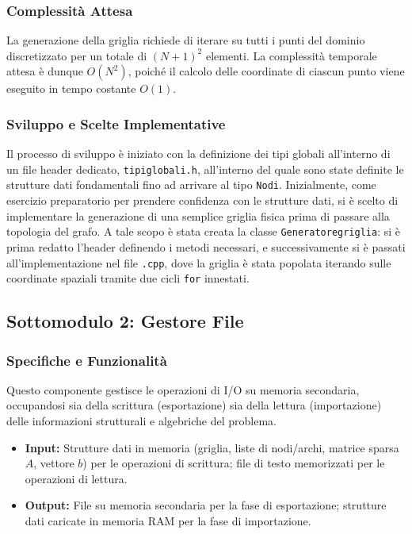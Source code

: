 \documentclass[twocolumn]{article}
\begin{document}
\subsubsection{Complessit\`a Attesa}
La generazione della griglia richiede di iterare su tutti i punti del dominio discretizzato per un totale di $(N+1)^2$ elementi. La complessit\`a temporale attesa \`e dunque $O(N^2)$, poich\'e il calcolo delle coordinate di ciascun punto viene eseguito in tempo costante $O(1)$.

\subsubsection{Sviluppo e Scelte Implementative}
Il processo di sviluppo è iniziato con la definizione dei tipi globali all'interno di un file header dedicato, \texttt{tipiglobali.h}, all'interno del quale sono state definite le strutture dati fondamentali fino ad arrivare al tipo \texttt{Nodi}. 
Inizialmente, come esercizio preparatorio per prendere confidenza con le strutture dati, si è scelto di implementare la generazione di una semplice griglia fisica prima di passare alla topologia del grafo. A tale scopo è stata creata la classe 
\texttt{Generatoregriglia}: si è prima redatto l'header definendo i metodi necessari, e successivamente si è passati all'implementazione nel file \texttt{.cpp}, dove la griglia è stata popolata iterando sulle coordinate spaziali tramite due cicli 
\texttt{for} innestati.

\subsection{Sottomodulo 2: Gestore File}

\subsubsection{Specifiche e Funzionalit\`a}
Questo componente gestisce le operazioni di I/O su memoria secondaria, occupandosi sia della scrittura (esportazione) sia della lettura (importazione) delle informazioni strutturali e algebriche del problema.
\begin{itemize}
    \item \textbf{Input:} Strutture dati in memoria (griglia, liste di nodi/archi, matrice sparsa $A$, vettore $b$) per le operazioni di scrittura; file di testo memorizzati per le operazioni di lettura.
    \item \textbf{Output:} File su memoria secondaria per la fase di esportazione; strutture dati caricate in memoria RAM per la fase di importazione.
\end{itemize}
\end{document}
